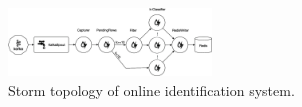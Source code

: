 \documentclass[conference]{IEEEtran}
\begin{document}
\begin{figure}[htp]
\begin{center}
\includegraphics[width=0.48\textwidth]{storm.eps}
\caption{Storm topology of online identification system.}\label{fig:storm}
\end{center}
\end{figure}







\end{document}
